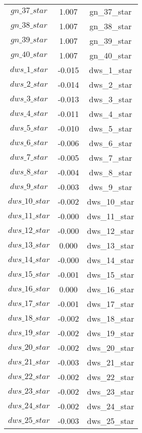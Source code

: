 \begin{center}
\begin{longtable}{ccc}
$gn\_37\_star$ 	 & 	 1.007 	 & 	 gn\_37\_star\\
$gn\_38\_star$ 	 & 	 1.007 	 & 	 gn\_38\_star\\
$gn\_39\_star$ 	 & 	 1.007 	 & 	 gn\_39\_star\\
$gn\_40\_star$ 	 & 	 1.007 	 & 	 gn\_40\_star\\
$dws\_1\_star$ 	 & 	 -0.015 	 & 	 dws\_1\_star\\
$dws\_2\_star$ 	 & 	 -0.014 	 & 	 dws\_2\_star\\
$dws\_3\_star$ 	 & 	 -0.013 	 & 	 dws\_3\_star\\
$dws\_4\_star$ 	 & 	 -0.011 	 & 	 dws\_4\_star\\
$dws\_5\_star$ 	 & 	 -0.010 	 & 	 dws\_5\_star\\
$dws\_6\_star$ 	 & 	 -0.006 	 & 	 dws\_6\_star\\
$dws\_7\_star$ 	 & 	 -0.005 	 & 	 dws\_7\_star\\
$dws\_8\_star$ 	 & 	 -0.004 	 & 	 dws\_8\_star\\
$dws\_9\_star$ 	 & 	 -0.003 	 & 	 dws\_9\_star\\
$dws\_10\_star$ 	 & 	 -0.002 	 & 	 dws\_10\_star\\
$dws\_11\_star$ 	 & 	 -0.000 	 & 	 dws\_11\_star\\
$dws\_12\_star$ 	 & 	 -0.000 	 & 	 dws\_12\_star\\
$dws\_13\_star$ 	 & 	 0.000 	 & 	 dws\_13\_star\\
$dws\_14\_star$ 	 & 	 -0.000 	 & 	 dws\_14\_star\\
$dws\_15\_star$ 	 & 	 -0.001 	 & 	 dws\_15\_star\\
$dws\_16\_star$ 	 & 	 0.000 	 & 	 dws\_16\_star\\
$dws\_17\_star$ 	 & 	 -0.001 	 & 	 dws\_17\_star\\
$dws\_18\_star$ 	 & 	 -0.002 	 & 	 dws\_18\_star\\
$dws\_19\_star$ 	 & 	 -0.002 	 & 	 dws\_19\_star\\
$dws\_20\_star$ 	 & 	 -0.002 	 & 	 dws\_20\_star\\
$dws\_21\_star$ 	 & 	 -0.003 	 & 	 dws\_21\_star\\
$dws\_22\_star$ 	 & 	 -0.002 	 & 	 dws\_22\_star\\
$dws\_23\_star$ 	 & 	 -0.002 	 & 	 dws\_23\_star\\
$dws\_24\_star$ 	 & 	 -0.002 	 & 	 dws\_24\_star\\
$dws\_25\_star$ 	 & 	 -0.003 	 & 	 dws\_25\_star\\

\end{longtable}
\end{center}
